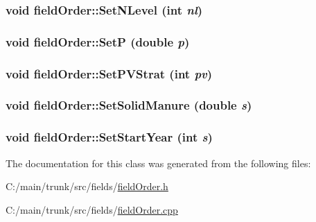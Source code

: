 \label{classfield_order_a88943af80816ed879533b2cc5dbc3f2b}
\hypertarget{classfield_order_a136008fdfe58b9aa8964bab673cc673c}{
\subsubsection[{SetNLevel}]{\setlength{\rightskip}{0pt plus 5cm}void fieldOrder::SetNLevel (int {\em nl})}}
\label{classfield_order_a136008fdfe58b9aa8964bab673cc673c}
\hypertarget{classfield_order_a68f6947497207ded7cbc7720acfbdade}{
\subsubsection[{SetP}]{\setlength{\rightskip}{0pt plus 5cm}void fieldOrder::SetP (double {\em p})}}
\label{classfield_order_a68f6947497207ded7cbc7720acfbdade}
\hypertarget{classfield_order_a64e26e4382b5e84dde4e24ad0c56e3cc}{
\subsubsection[{SetPVStrat}]{\setlength{\rightskip}{0pt plus 5cm}void fieldOrder::SetPVStrat (int {\em pv})}}
\label{classfield_order_a64e26e4382b5e84dde4e24ad0c56e3cc}
\hypertarget{classfield_order_af0edd102b669c807dbbe5b30373d9a84}{
\subsubsection[{SetSolidManure}]{\setlength{\rightskip}{0pt plus 5cm}void fieldOrder::SetSolidManure (double {\em s})}}
\label{classfield_order_af0edd102b669c807dbbe5b30373d9a84}
\hypertarget{classfield_order_a643622d18b25f4a4798562411ed14211}{
\subsubsection[{SetStartYear}]{\setlength{\rightskip}{0pt plus 5cm}void fieldOrder::SetStartYear (int {\em s})}}
\label{classfield_order_a643622d18b25f4a4798562411ed14211}


The documentation for this class was generated from the following files:\begin{DoxyCompactItemize}
\item 
C:/main/trunk/src/fields/\hyperlink{field_order_8h}{fieldOrder.h}\item 
C:/main/trunk/src/fields/\hyperlink{field_order_8cpp}{fieldOrder.cpp}\end{DoxyCompactItemize}
